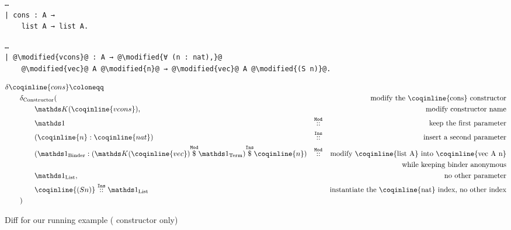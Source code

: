 \begin{figure*}[!htp]

  \noindent%
  \begin{minipage}[t]{0.50\textwidth}
    \begin{verbatim}
…
| cons : A →
    list A → list A.
  \end{verbatim}
\end{minipage}%
\begin{minipage}[t]{0.50\textwidth}
  \begin{verbatim}
…
| @\modified{vcons}@ : A → @\modified{∀ (n : nat),}@
    @\modified{vec}@ A @\modified{n}@ → @\modified{vec}@ A @\modified{(S n)}@.
  \end{verbatim}
\end{minipage}

  \vspace{2em}%

  \begin{align*}
& \delta\coqinline{cons} \coloneqq & && \\
& \qquad \delta_{\ConstructorText} (  & && \text{modify the \coqinline{cons} constructor} \\
& \qquad \qquad \MathReplace{\coqinline{vcons}}, & && \text{modify constructor name} \\
& \qquad \qquad \MathSame{} & \MathMod{}{} && \text{keep the first parameter} \\
& \qquad \qquad ( \coqinline{n} : \coqinline{nat} ) & \MathIns{}{} && \text{insert a second parameter} \\
& \qquad \qquad ( \MathSameBinder{} : \MathInsApp
  {(\MathModApp{\MathReplace{\coqinline{vec}}}{\MathSameTerm{}})}
  {\coqinline{n}}
) & \MathMod{}{}
  && \text{modify \coqinline{list A} into \coqinline{vec A n}} \\
& & && \text{while keeping binder anonymous} \\
& \qquad \qquad \MathSameList{}, & && \text{no other parameter} \\
& \qquad \qquad \MathIns{\coqinline{(S n)}}{\MathSameList{}} &
  && \text{instantiate the \coqinline{nat} index, no other index} \\
& \qquad ) && \\
  \end{align*}

  \caption{Diff for our running example ( constructor only)}
  \label{diff-list-vec-cons}

\end{figure*}

